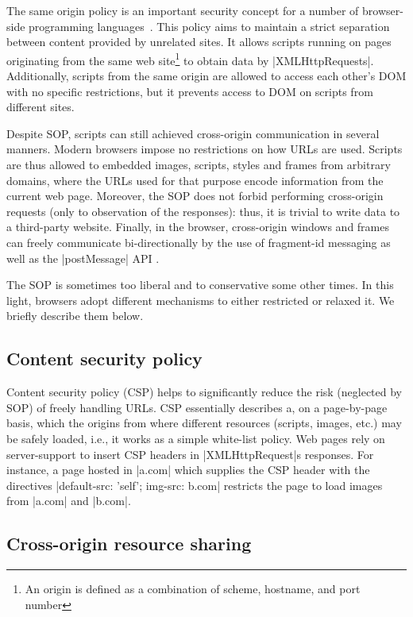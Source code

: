 The same origin policy is an important security concept for a number of
browser-side programming languages~\tocite{}. This policy aims to maintain a strict
separation between content provided by unrelated sites. It allows scripts
running on pages originating from the same web site\footnote{An origin is 
defined as a combination of scheme, hostname, and port number} to obtain data
by \js|XMLHttpRequests|. Additionally, scripts from the same origin are allowed to
access each other's DOM with no specific restrictions, but it prevents access to
DOM on scripts from different sites. 

Despite SOP, scripts can still achieved cross-origin communication in several
manners. Modern browsers impose no restrictions on how URLs are used. Scripts
are thus allowed to embedded images, scripts, styles and frames from arbitrary
domains, where the URLs used for that purpose encode information from the
current web page. Moreover, the SOP does not forbid performing cross-origin
requests (only to observation of the responses): thus, it is trivial to write
data to a third-party website. Finally, in the browser, cross-origin windows and
frames can freely communicate bi-directionally by the use of fragment-id \tocite{}
messaging as well as the \js|postMessage| API \tocite{}.

The SOP is sometimes too liberal and to conservative some other times. In this
light, browsers adopt different mechanisms to either restricted or relaxed it.
We briefly describe them below. 

\subsection {Content security policy} 

Content security policy  (CSP) \tocite{} helps to significantly reduce
the risk (neglected by SOP) of freely handling URLs. CSP essentially describes
a, on a page-by-page basis, which the origins from where different resources
(scripts, images, etc.) may be safely loaded, i.e., it works as a simple
white-list policy.  Web pages rely on server-support to insert CSP headers in
\js|XMLHttpRequest|s responses. For instance, a page hosted in \js|a.com| 
which supplies the CSP header with the directives 
%
\js|default-src: ’self’; img-src: b.com| 
%
restricts the page to load images from \js|a.com| and \js|b.com|.



\subsection{Cross-origin resource sharing } 


